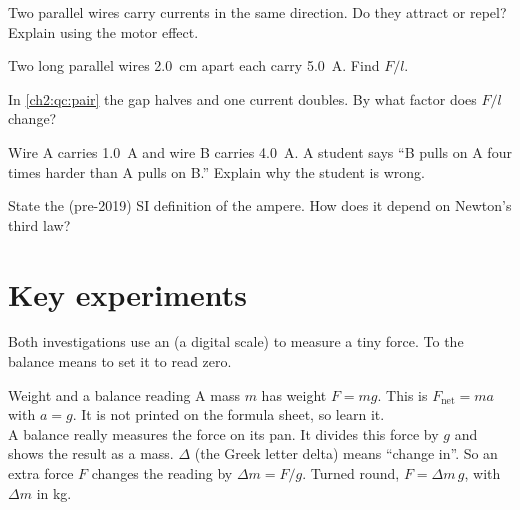 \begin{quickcheck}
  \item Two parallel wires carry currents in the same direction. Do they attract or repel?
        Explain using the motor effect.
  \item Two long parallel wires \qty{2.0}{cm} apart each carry \qty{5.0}{A}. Find $F/l$.\label{ch2:qc:pair}
  \item In \cref{ch2:qc:pair} the gap halves and one current doubles. By what factor does $F/l$ change?
  \item Wire A carries \qty{1.0}{A} and wire B carries \qty{4.0}{A}. A student says ``B pulls on A
        four times harder than A pulls on B.'' Explain why the student is wrong.
  \item State the (pre-2019) SI definition of the ampere. How does it depend on Newton's third law?
\end{quickcheck}

\section{Key experiments}\label{ch2:sec:experiments}

\begin{keywords}
\end{keywords}

Both investigations use an  (a digital scale) to measure a tiny force.
To  the balance means to set it to read zero.

\begin{refresher}{Weight and a balance reading}
A mass $m$ has weight $F = mg$. This is $F_\mathrm{net} = ma$ with $a = g$. It is not printed on
the formula sheet, so learn it.\\
A balance really measures the force on its pan. It divides this force by $g$ and shows the result
as a mass. $\Delta$ (the Greek letter delta) means ``change in''. So an extra force $F$ changes
the reading by $\Delta m = F/g$. Turned round, $F = \Delta m\, g$, with $\Delta m$ in kg.
\end{refresher}

